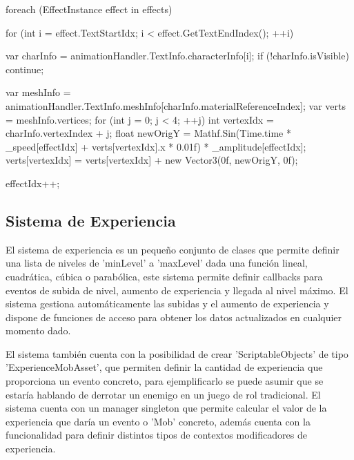 \begin{mypython}[caption={Ejemplo de código utilizado para definir la animación de 'Wobble' en el texto.},label={alg:wobbleAnimation}]
    foreach (EffectInstance effect in effects) 
    {
        for (int i = effect.TextStartIdx; i < effect.GetTextEndIndex(); ++i)
        {
            var charInfo = animationHandler.TextInfo.characterInfo[i];
            if (!charInfo.isVisible)
            {
                continue;
            }
            
            var meshInfo = animationHandler.TextInfo.meshInfo[charInfo.materialReferenceIndex];
            var verts = meshInfo.vertices;
            for (int j = 0; j < 4; ++j)
            {
                int vertexIdx = charInfo.vertexIndex + j;
                float newOrigY = Mathf.Sin(Time.time * _speed[effectIdx] + verts[vertexIdx].x * 0.01f) * _amplitude[effectIdx];
                verts[vertexIdx] = verts[vertexIdx] + new Vector3(0f, newOrigY, 0f);
            }
        }
        effectIdx++;
    }
\end{mypython}

\subsection{Sistema de Experiencia}
El sistema de experiencia es un pequeño conjunto de clases que permite definir una lista de niveles de 'minLevel' a 'maxLevel' dada una función lineal, cuadrática, cúbica o 
 parabólica, este sistema permite definir callbacks para eventos de subida de nivel, aumento de experiencia y llegada al nivel máximo. El sistema gestiona automáticamente las
 subidas y el aumento de experiencia y dispone de funciones de acceso para obtener los datos actualizados en cualquier momento dado.

El sistema también cuenta con la posibilidad de crear 'ScriptableObjects' de tipo 'ExperienceMobAsset', que permiten definir la cantidad de experiencia que proporciona un evento 
 concreto, para ejemplificarlo se puede asumir que se estaría hablando de derrotar un enemigo en un juego de rol tradicional. El sistema cuenta con un manager singleton que 
 permite calcular el valor de la experiencia que daría un evento o 'Mob' concreto, además cuenta con la funcionalidad para definir distintos tipos de contextos modificadores 
 de experiencia.


